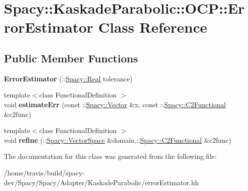 \hypertarget{classSpacy_1_1KaskadeParabolic_1_1OCP_1_1ErrorEstimator}{\section{Spacy\-:\-:Kaskade\-Parabolic\-:\-:O\-C\-P\-:\-:Error\-Estimator Class Reference}
\label{classSpacy_1_1KaskadeParabolic_1_1OCP_1_1ErrorEstimator}
}
\subsection*{Public Member Functions}
\begin{DoxyCompactItemize}
\item 
\hypertarget{classSpacy_1_1KaskadeParabolic_1_1OCP_1_1ErrorEstimator_adedb6785ec7748374a42d9fc1c3b4a8e}{{\bfseries Error\-Estimator} (\-::\hyperlink{classSpacy_1_1Real}{Spacy\-::\-Real} tolerance)}\label{classSpacy_1_1KaskadeParabolic_1_1OCP_1_1ErrorEstimator_adedb6785ec7748374a42d9fc1c3b4a8e}

\item 
\hypertarget{classSpacy_1_1KaskadeParabolic_1_1OCP_1_1ErrorEstimator_ab6593fd68df7d99e66ea0ed88c5e76e6}{{\footnotesize template$<$class Functional\-Definition $>$ }\\void {\bfseries estimate\-Err} (const \-::\hyperlink{classSpacy_1_1Vector}{Spacy\-::\-Vector} \&x, const \-::\hyperlink{classSpacy_1_1C2Functional}{Spacy\-::\-C2\-Functional} \&c2func)}\label{classSpacy_1_1KaskadeParabolic_1_1OCP_1_1ErrorEstimator_ab6593fd68df7d99e66ea0ed88c5e76e6}

\item 
\hypertarget{classSpacy_1_1KaskadeParabolic_1_1OCP_1_1ErrorEstimator_a3d3894fbd59b6f52fb167c6f530b83a7}{{\footnotesize template$<$class Functional\-Definition $>$ }\\void {\bfseries refine} (\-::\hyperlink{classSpacy_1_1VectorSpace}{Spacy\-::\-Vector\-Space} \&domain,\-::\hyperlink{classSpacy_1_1C2Functional}{Spacy\-::\-C2\-Functional} \&c2func)}\label{classSpacy_1_1KaskadeParabolic_1_1OCP_1_1ErrorEstimator_a3d3894fbd59b6f52fb167c6f530b83a7}

\end{DoxyCompactItemize}


The documentation for this class was generated from the following file\-:\begin{DoxyCompactItemize}
\item 
/home/travis/build/spacy-\/dev/\-Spacy/\-Spacy/\-Adapter/\-Kaskade\-Parabolic/error\-Estimator.\-hh\end{DoxyCompactItemize}
